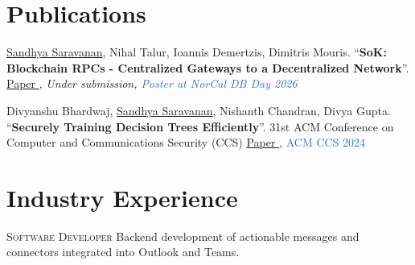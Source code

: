 \documentclass[13pt, a4paper, roman]{moderncv} %
\begin{document}



\section{Publications}

{
\underline{Sandhya Saravanan}, Nihal Talur, Ioannis Demertzis, Dimitris Mouris. ``\textbf{SoK: Blockchain RPCs - Centralized Gateways to a Decentralized Network}''. \newline{}\textcolor{link}{\href{https://idemertzis.com/Papers/SoK_RPC.pdf}{Paper \ExternalLink}}, \emph{Under submission, \textcolor{highlight}{Poster at NorCal DB Day 2026}}
}

{
Divyanshu Bhardwaj, \underline{Sandhya Saravanan}, Nishanth Chandran, Divya Gupta. ``\textbf{Securely Training Decision Trees Efficiently}''. 31st ACM Conference on Computer and Communications Security (CCS) \newline{}\textcolor{link}{{\href{https://eprint.iacr.org/2024/1077}{Paper \ExternalLink}}, \textcolor{highlight}{ACM CCS 2024}}
}


\section{Industry Experience}

{\textsc{Software Developer}
\newline{}
Backend development of actionable messages and connectors integrated into Outlook and Teams.}
\end{document}

